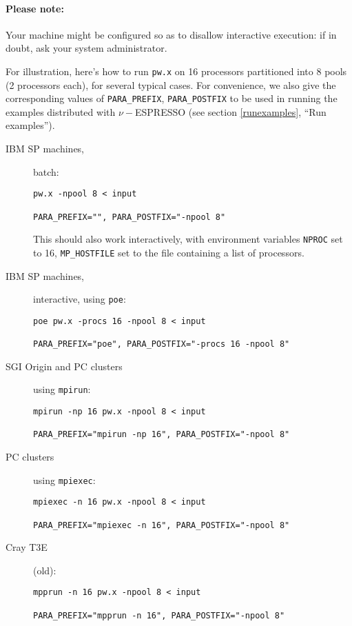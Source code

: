 \documentclass[12pt,a4paper]{article}
\begin{document}
\paragraph{Please note:}
Your machine might be configured so as to disallow interactive
execution: if in doubt, ask your system administrator.
\bigskip

For illustration, here's how to run \texttt{pw.x} on 16 processors
partitioned into 8 pools (2 processors each), for several typical
cases.
For convenience, we also give the corresponding values of
\texttt{PARA\_PREFIX}, \texttt{PARA\_POSTFIX} to be used in running
the examples distributed with $\nu-$ESPRESSO (see section \ref{runexamples},
``Run examples'').

\begin{description}
  \item [IBM SP machines,] batch:
\begin{verbatim}
pw.x -npool 8 < input

PARA_PREFIX="", PARA_POSTFIX="-npool 8"
\end{verbatim}
    This should also work interactively, with environment variables
    \texttt{NPROC} set to 16, \texttt{MP\_HOSTFILE} set to the file
    containing a list of processors.
  \item [IBM SP machines,] interactive, using \texttt{poe}:
\begin{verbatim}
poe pw.x -procs 16 -npool 8 < input

PARA_PREFIX="poe", PARA_POSTFIX="-procs 16 -npool 8"
\end{verbatim}
  \item [SGI Origin and PC clusters] using \texttt{mpirun}:
\begin{verbatim}
mpirun -np 16 pw.x -npool 8 < input

PARA_PREFIX="mpirun -np 16", PARA_POSTFIX="-npool 8"
\end{verbatim}
  \item [PC clusters] using \texttt{mpiexec}:
\begin{verbatim}
mpiexec -n 16 pw.x -npool 8 < input

PARA_PREFIX="mpiexec -n 16", PARA_POSTFIX="-npool 8"
\end{verbatim}
  \item [Cray T3E] (old):
\begin{verbatim}
mpprun -n 16 pw.x -npool 8 < input

PARA_PREFIX="mpprun -n 16", PARA_POSTFIX="-npool 8"
\end{verbatim}
\end{description}
\end{document}
